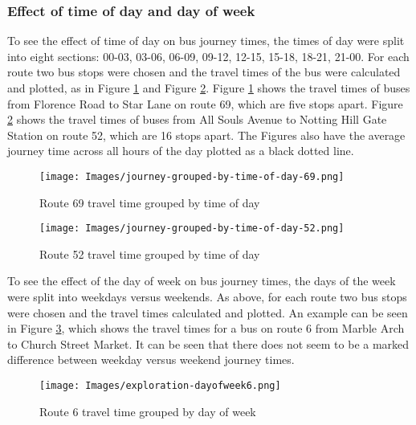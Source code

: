 \subsubsection{Effect of time of day and day of week}

To see the effect of time of day on bus journey times, the times of day were split into eight sections: 00-03, 03-06, 06-09, 09-12, 12-15, 15-18, 18-21, 21-00. For each route two bus stops were chosen and the travel times of the bus were calculated and plotted, as in Figure \ref{fig:time-of-day-69} and Figure \ref{fig:time-of-day-52}. Figure \ref{fig:time-of-day-69} shows the travel times of buses from Florence Road to Star Lane on route 69, which are five stops apart. Figure \ref{fig:time-of-day-52} shows the travel times of buses from All Souls Avenue to Notting Hill Gate Station on route 52, which are 16 stops apart. The Figures also have the average journey time across all hours of the day plotted as a black dotted line. 

\begin{figure}[H]
\begin{center}
    \texttt{[image: Images/journey-grouped-by-time-of-day-69.png]}
    \caption{Route 69 travel time grouped by time of day}
    \label{fig:time-of-day-69}
\end{center}
\end{figure}

\begin{figure}[H]
\begin{center}
    \texttt{[image: Images/journey-grouped-by-time-of-day-52.png]}
    \caption{Route 52 travel time grouped by time of day}
    \label{fig:time-of-day-52}
\end{center}
\end{figure}

To see the effect of the day of week on bus journey times, the days of the week were split into weekdays versus weekends. As above, for each route two bus stops were chosen and the travel times calculated and plotted. An example can be seen in Figure \ref{fig:day-of-week6}, which shows the travel times for a bus on route 6 from Marble Arch to Church Street Market. It can be seen that there does not seem to be a marked difference between weekday versus weekend journey times. 

\begin{figure}[H]
\begin{center}
    \texttt{[image: Images/exploration-dayofweek6.png]}
    \caption{Route 6 travel time grouped by day of week}
    \label{fig:day-of-week6}
\end{center}
\end{figure}


